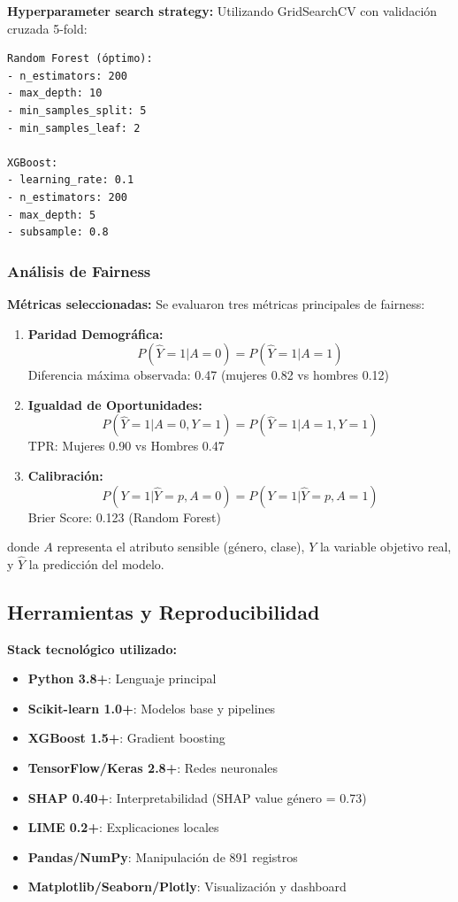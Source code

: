\documentclass[conference]{IEEEtran}
\begin{document}
\textbf{Hyperparameter search strategy:}
Utilizando GridSearchCV con validación cruzada 5-fold:

\begin{verbatim}
Random Forest (óptimo):
- n_estimators: 200
- max_depth: 10
- min_samples_split: 5
- min_samples_leaf: 2

XGBoost:
- learning_rate: 0.1
- n_estimators: 200
- max_depth: 5
- subsample: 0.8
\end{verbatim}

\subsubsection{Análisis de Fairness}

\textbf{Métricas seleccionadas:}
Se evaluaron tres métricas principales de fairness:

\begin{enumerate}
\item \textbf{Paridad Demográfica:} 
$$P(\hat{Y} = 1|A = 0) = P(\hat{Y} = 1|A = 1)$$
Diferencia máxima observada: 0.47 (mujeres 0.82 vs hombres 0.12)

\item \textbf{Igualdad de Oportunidades:} 
$$P(\hat{Y} = 1|A = 0, Y = 1) = P(\hat{Y} = 1|A = 1, Y = 1)$$
TPR: Mujeres 0.90 vs Hombres 0.47

\item \textbf{Calibración:} 
$$P(Y = 1|\hat{Y} = p, A = 0) = P(Y = 1|\hat{Y} = p, A = 1)$$
Brier Score: 0.123 (Random Forest)
\end{enumerate}

donde $A$ representa el atributo sensible (género, clase), $Y$ la variable objetivo real, y $\hat{Y}$ la predicción del modelo.

\subsection{Herramientas y Reproducibilidad}

\textbf{Stack tecnológico utilizado:}
\begin{itemize}
\item \textbf{Python 3.8+}: Lenguaje principal
\item \textbf{Scikit-learn 1.0+}: Modelos base y pipelines
\item \textbf{XGBoost 1.5+}: Gradient boosting
\item \textbf{TensorFlow/Keras 2.8+}: Redes neuronales
\item \textbf{SHAP 0.40+}: Interpretabilidad (SHAP value género = 0.73)
\item \textbf{LIME 0.2+}: Explicaciones locales
\item \textbf{Pandas/NumPy}: Manipulación de 891 registros
\item \textbf{Matplotlib/Seaborn/Plotly}: Visualización y dashboard
\end{itemize}
\end{document}
